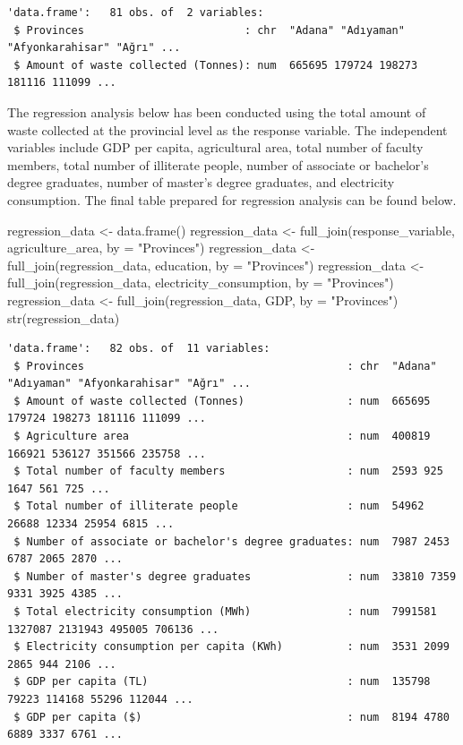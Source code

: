 \documentclass[
  11pt,
  a4paper,
  DIV=11,
  numbers=noendperiod]{scrartcl}
\newenvironment{Shaded}{\begin{snugshade}}{\end{snugshade}}
\newcommand{\AttributeTok}[1]{\textcolor[rgb]{0.40,0.45,0.13}{#1}}
\newcommand{\FunctionTok}[1]{\textcolor[rgb]{0.28,0.35,0.67}{#1}}
\newcommand{\NormalTok}[1]{\textcolor[rgb]{0.00,0.23,0.31}{#1}}
\newcommand{\OtherTok}[1]{\textcolor[rgb]{0.00,0.23,0.31}{#1}}
\newcommand{\StringTok}[1]{\textcolor[rgb]{0.13,0.47,0.30}{#1}}
\begin{document}
\begin{verbatim}
'data.frame':   81 obs. of  2 variables:
 $ Provinces                         : chr  "Adana" "Adıyaman" "Afyonkarahisar" "Ağrı" ...
 $ Amount of waste collected (Tonnes): num  665695 179724 198273 181116 111099 ...
\end{verbatim}

{The regression analysis} below has been conducted using the {total
amount of waste collected} at the provincial level as the response
variable. {The independent variables} include {GDP per capita,
agricultural area, total number of faculty members, total number of
illiterate people, number of associate or bachelor's degree graduates,
number of master's degree graduates, and electricity consumption}. The
final table prepared for regression analysis can be found below.

\begin{Shaded}
\begin{Highlighting}[]
\NormalTok{regression\_data }\OtherTok{\textless{}{-}} \FunctionTok{data.frame}\NormalTok{()}
\NormalTok{regression\_data }\OtherTok{\textless{}{-}} \FunctionTok{full\_join}\NormalTok{(response\_variable, agriculture\_area, }\AttributeTok{by =} \StringTok{"Provinces"}\NormalTok{)}
\NormalTok{regression\_data }\OtherTok{\textless{}{-}} \FunctionTok{full\_join}\NormalTok{(regression\_data, education,  }\AttributeTok{by =} \StringTok{"Provinces"}\NormalTok{)}
\NormalTok{regression\_data }\OtherTok{\textless{}{-}} \FunctionTok{full\_join}\NormalTok{(regression\_data, electricity\_consumption,  }\AttributeTok{by =} \StringTok{"Provinces"}\NormalTok{)}
\NormalTok{regression\_data }\OtherTok{\textless{}{-}} \FunctionTok{full\_join}\NormalTok{(regression\_data, GDP,  }\AttributeTok{by =} \StringTok{"Provinces"}\NormalTok{)}
\FunctionTok{str}\NormalTok{(regression\_data)}
\end{Highlighting}
\end{Shaded}

\begin{verbatim}
'data.frame':   82 obs. of  11 variables:
 $ Provinces                                         : chr  "Adana" "Adıyaman" "Afyonkarahisar" "Ağrı" ...
 $ Amount of waste collected (Tonnes)                : num  665695 179724 198273 181116 111099 ...
 $ Agriculture area                                  : num  400819 166921 536127 351566 235758 ...
 $ Total number of faculty members                   : num  2593 925 1647 561 725 ...
 $ Total number of illiterate people                 : num  54962 26688 12334 25954 6815 ...
 $ Number of associate or bachelor's degree graduates: num  7987 2453 6787 2065 2870 ...
 $ Number of master's degree graduates               : num  33810 7359 9331 3925 4385 ...
 $ Total electricity consumption (MWh)               : num  7991581 1327087 2131943 495005 706136 ...
 $ Electricity consumption per capita (KWh)          : num  3531 2099 2865 944 2106 ...
 $ GDP per capita (TL)                               : num  135798 79223 114168 55296 112044 ...
 $ GDP per capita ($)                                : num  8194 4780 6889 3337 6761 ...
\end{verbatim}
\end{document}
